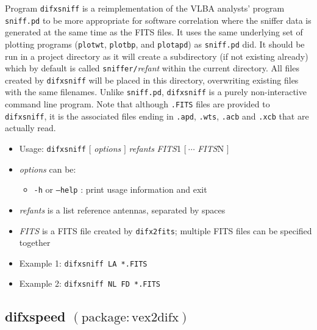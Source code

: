 Program {\tt difxsniff} is a reimplementation of the VLBA analysts' program {\tt sniff.pd} to be more appropriate for software correlation where the sniffer data is generated at the same time as the FITS files.
It uses the same underlying set of plotting programs ({\tt plotwt}, {\tt plotbp}, and {\tt plotapd}) as {\tt sniff.pd} did.
It should be run in a project directory as it will create a subdirectory (if not existing already) which by default is called {\tt sniffer/}{\em refant} within the current directory.
All files created by {\tt difxsniff} will be placed in this directory, overwriting existing files with the same filenames.
Unlike {\tt sniff.pd}, {\tt difxsniff} is a purely non-interactive command line program.
Note that although {\tt .FITS} files are provided to {\tt difxsniff}, it is the associated files ending in {\tt .apd}, {\tt .wts}, {\tt .acb} and {\tt .xcb} that are actually read.

\begin{itemize}
\item[] Usage: {\tt difxsniff} $[$ {\em options} $]$ {\em refants} {\em FITS}1 $[\ \cdots$ {\em FITS}N $]$
\item[] {\em options} can be:
\begin{itemize}
\item[] {\tt -h} or {\tt --help} : print usage information and exit
\end{itemize}
\item[] {\em refants} is a list reference antennas, separated by spaces
\item[] {\em FITS} is a FITS file created by {\tt difx2fits}; multiple FITS files can be specified together
\item[] Example 1: {\tt difxsniff LA *.FITS}
\item[] Example 2: {\tt difxsniff NL FD *.FITS}
\end{itemize}







\subsection{difxspeed {\small $\mathrm{(package: vex2difx)}$}} \label{sec:difxspeed}

